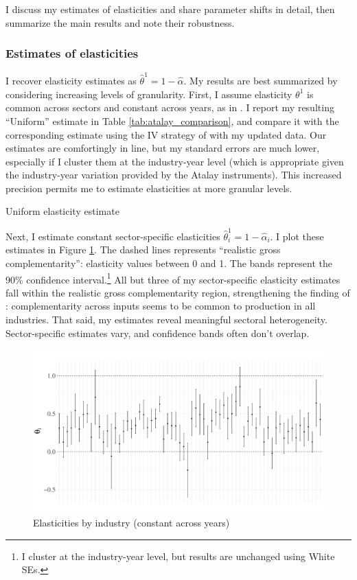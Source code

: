 \documentclass[11pt]{article}
\begin{document}
I discuss my estimates of elasticities and share parameter shifts in detail, then summarize the main results and note their robustness.

\subsubsection*{Estimates of elasticities}

I recover elasticity estimates as $\hat{\theta}^1 = 1 - \hat{\alpha}$. My results are best summarized by considering increasing levels of granularity. First, I assume elasticity $\theta^1$ is common across sectors and constant across years, as in \citet{atalayHowImportantAre2017}. I report my resulting ``Uniform'' estimate in Table \ref{tab:atalay_comparison}, and compare it with the corresponding estimate using the IV strategy of \citet{atalayHowImportantAre2017} with my updated data. Our estimates are comfortingly in line, but my standard errors are much lower, especially if I cluster them at the industry-year level (which is appropriate given the industry-year variation provided by the Atalay instruments). This increased precision permits me to estimate elasticities at more granular levels.

\begin{table}[!h]
    \centering 
    \caption{Uniform elasticity estimate}
    \label{tab:atalay_comparison}
    
\end{table}

Next, I estimate constant sector-specific elasticities $\hat{\theta}^1_i = 1 - \hat{\alpha}_i$. I plot these estimates in Figure \ref{fig:theta_onlyCode}. The dashed lines represents ``realistic gross complementarity'': elasticity values between 0 and 1. The bands represent the 90\% confidence interval.\footnote{I cluster at the industry-year level, but results are unchanged using White SEs.} All but three of my sector-specific elasticity estimates fall within the realistic gross complementarity region, strengthening the finding of \citet{atalayHowImportantAre2017}: complementarity across inputs seems to be common to production in all industries. That said, my estimates reveal meaningful sectoral heterogeneity. Sector-specific estimates vary, and confidence bands often don't overlap.    

\begin{figure}[!h]
    \centering 
    \includegraphics[width=.75\textwidth]{../figures/elasticity_est/elasticity_onlyCode.pdf}
    \caption{Elasticities by industry (constant across years)}
    \label{fig:theta_onlyCode}
\end{figure}
\end{document}
